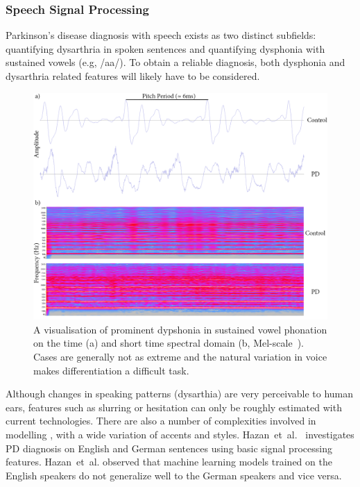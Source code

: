 \documentclass[12pt, twoside]{book}
\renewcommand\emph[1]{\textit{\color{USred}{#1}}}
\begin{document}
\subsubsection{Speech Signal Processing}
Parkinson's disease diagnosis with speech exists as two distinct subfields: quantifying dysarthria in spoken sentences and quantifying dysphonia with sustained vowels (e.g, /aa/). To obtain a reliable diagnosis, both dysphonia and dysarthria related features will likely have to be considered.


\begin{figure}[h]
	\label{spectrogram}
	\centering\centerline{\includegraphics[width=1.2\linewidth]{timespectrogram.png}}
	\caption{A visualisation of prominent dypshonia in sustained vowel phonation on the time (a) and short time spectral domain (b, Mel-scale~\cite{mfscale}). Cases are generally not as extreme and the natural variation in voice makes differentiation a difficult task.}
\end{figure}


Although changes in speaking patterns (dysarthia) are very perceivable to human ears, features such as slurring or hesitation can only be roughly estimated with current technologies. There are also a number of complexities involved in modelling \emph{spoken language}, with a wide variation of accents and styles. Hazan~et~al.~\cite{hazan2012} investigates PD diagnosis on English and German sentences using basic signal processing features. Hazan~et~al. observed that machine learning models trained on the English speakers do not generalize well to the German speakers and vice versa. 
\end{document}
